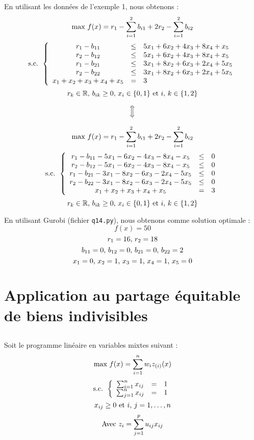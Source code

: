 \documentclass{article}
\begin{document}
En utilisant les données de l'exemple 1, nous obtenons :
$$\textmd{max }f(x)= r_1 - \sum_{i=1}^{2}b_{i1} + 2r_2 - \sum_{i=1}^{2}b_{i2}$$
$$
\textmd{s.c. }
\left \{
\begin{array}{c c l}
  r_1 - b_{11} & \leq & 5x_1+ 6x_2+ 4x_3+ 8x_4+x_5 \\
  r_2 - b_{12} & \leq & 5x_1+ 6x_2+ 4x_3+ 8x_4+x_5 \\
  r_1 - b_{21} & \leq & 3x_1+ 8x_2+ 6x_3+ 2x_4+ 5x_5 \\
  r_2 - b_{22} & \leq & 3x_1+ 8x_2+ 6x_3+ 2x_4+ 5x_5 \\
  x_1 + x_2 + x_3 + x_4 + x_5 & = & 3
\end{array}
\right .
$$
$$r_k \in \mathbb{R}\textmd{, }b_{ik} \geq 0\textmd{, }x_i \in \{0,1\} \textmd{ et }i\textmd{, }k\in\{1, 2\}$$

$$\Big\Updownarrow$$

$$\textmd{max }f(x)= r_1 - \sum_{i=1}^{2}b_{i1} + 2r_2 - \sum_{i=1}^{2}b_{i2}$$
$$
\textmd{s.c. }
\left \{
\begin{array}{c c l}
  r_1 - b_{11} - 5x_1- 6x_2- 4x_3- 8x_4- x_5 & \leq & 0 \\
  r_2 - b_{12} - 5x_1- 6x_2- 4x_3- 8x_4- x_5& \leq & 0 \\
  r_1 - b_{21} - 3x_1- 8x_2- 6x_3- 2x_4- 5x_5& \leq & 0 \\
  r_2 - b_{22} - 3x_1- 8x_2- 6x_3- 2x_4- 5x_5& \leq & 0 \\
  x_1 + x_2 + x_3 + x_4 + x_5 & = & 3
\end{array}
\right .
$$
$$r_k \in \mathbb{R} \textmd{, }b_{ik} \geq 0\textmd{, }x_i \in \{0,1\} \textmd{ et }i\textmd{, }k\in\{1, 2\}$$

En utilisant Gurobi (fichier \texttt{q14.py}), nous obtenons comme solution optimale :
$$f(x) = 50$$
$$r_1 = 16 \textmd{, }r_2 = 18$$
$$b_{11} = 0\textmd{, }b_{12} = 0\textmd{, }b_{21} = 0\textmd{, }b_{22} = 2$$
$$x_1 = 0\textmd{, }x_2 = 1\textmd{, }x_3 = 1\textmd{, }x_4 = 1\textmd{, }x_5 = 0$$


\section{Application au partage équitable de biens indivisibles}
\subsection{} Soit le programme linéaire en variables mixtes suivant :
$$\textmd{max } f(x) = \sum_{i=1}^nw_iz_{(i)}(x)$$
$$
\textmd{s.c. }
\left \{
\begin{array}{c c l}
  \sum_{i=1}^n x_{ij} & = & 1 \\
  \sum_{j=1}^n x_{ij} & = & 1
\end{array}
\right .
$$
$$x_{ij} \geq 0 \textmd{ et } i\textmd{, }j = 1,\ldots,n$$
$$\textmd{Avec } z_i = \sum_{j=1}^{p}u_{ij}x_{ij}$$
\end{document}
